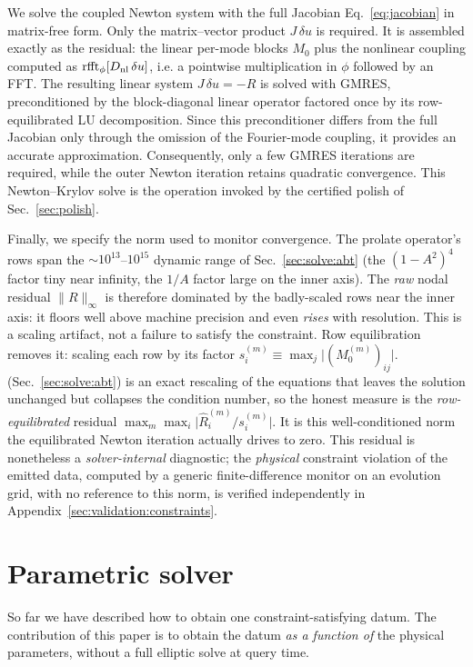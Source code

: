 \documentclass[
  aps,
  prd,
  twocolumn,
  amsmath,
  amssymb,
  nofootinbib,
  superscriptaddress,
  floatfix,
]{revtex4-2}
\begin{document}
We solve the coupled Newton system with the full Jacobian
Eq.~\eqref{eq:jacobian} in matrix-free form. Only the matrix--vector product
$J\,\delta u$ is required. It is assembled exactly as the residual: the linear
per-mode blocks $M_0$ plus the nonlinear coupling computed as
$\mathrm{rfft}_\phi[D_{\rm nl}\,\delta u]$, i.e. a pointwise multiplication in
$\phi$ followed by an FFT. The resulting linear system
$J\,\delta u=-R$ is solved with GMRES, preconditioned by the block-diagonal
linear operator factored once by its row-equilibrated LU decomposition. Since
this preconditioner differs from the full Jacobian only through the omission of
the Fourier-mode coupling, it provides an accurate approximation. Consequently,
only a few GMRES iterations are required, while the outer Newton iteration
retains quadratic convergence. This Newton--Krylov solve is the operation
invoked by the certified polish of Sec.~\ref{sec:polish}.


Finally, we specify the norm used to monitor convergence.
The prolate operator's rows span the $\sim\!10^{13}$--$10^{15}$ dynamic range of
Sec.~\ref{sec:solve:abt} (the $(1-A^2)^4$ factor tiny near infinity, the $1/A$
factor large on the inner axis). The \emph{raw} nodal residual $\|R\|_\infty$ is
therefore dominated by the badly-scaled rows near the inner axis: it floors well
above machine precision and even \emph{rises} with resolution. This is a scaling
artifact, not a failure to satisfy the
constraint. Row equilibration removes it: scaling each row by its factor $s^{(m)}_i \equiv \max_j \bigl|(M_0^{(m)})_{ij}\bigr|.$
(Sec.~\ref{sec:solve:abt}) is an exact rescaling of the equations that leaves the
solution unchanged but collapses the condition number, so the honest measure is the
\emph{row-equilibrated} residual $\max_m \max_i \big|\hat R^{(m)}_{i}/s^{(m)}_{i} \big|$. It is this
well-conditioned norm the equilibrated Newton iteration actually drives to zero.
This residual is nonetheless a \emph{solver-internal} diagnostic; the
\emph{physical} constraint violation of the emitted data, computed by a generic
finite-difference monitor on an evolution grid, with no reference to this
norm, is verified independently in Appendix~\ref{sec:validation:constraints}.


\section{Parametric solver}
\label{sec:param}
So far we have described how to obtain one constraint-satisfying datum. The
contribution of this paper is to obtain the datum \emph{as a function of} the
physical parameters, without a full elliptic solve at query time.
\end{document}
